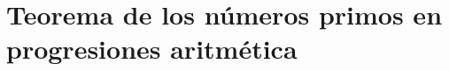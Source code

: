 
\thispagestyle{empty}
\vspace{-0.5cm}



\section{Teorema de los números primos en progresiones aritmética}